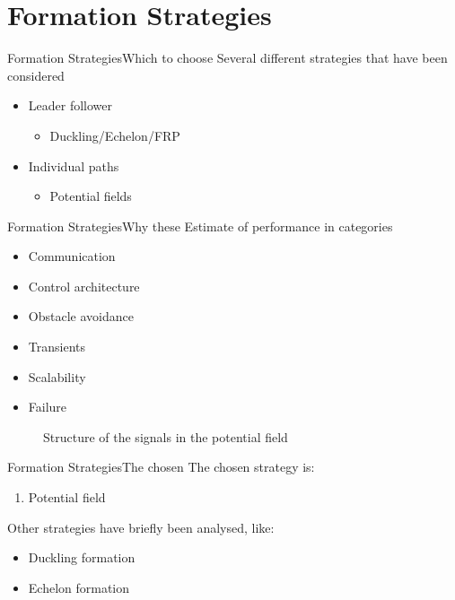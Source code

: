 \documentclass[10pt,handout]{beamer}
\begin{document}
\section{Formation Strategies}
\begin{frame}{Formation Strategies}{Which to choose}
Several different strategies that have been considered
  \begin{itemize}
    \item Leader follower
    \begin{itemize}
      \item Duckling/Echelon/FRP
    \end{itemize}
    \item Individual paths
    \begin{itemize}
      \item Potential fields
    \end{itemize}
   \end{itemize}
\end{frame}

\begin{frame}{Formation Strategies}{Why these}
Estimate of performance in categories
\begin{itemize}
  \item Communication
  \item Control architecture
  \item Obstacle avoidance
  \item Transients
  \item Scalability
  \item Failure
\end{itemize}
\begin{figure}
    {\tiny }
    \caption{\scriptsize Structure of the signals in the potential field}
  \end{figure}
\end{frame}

\begin{frame}{Formation Strategies}{The chosen}
The chosen strategy is:
\begin{enumerate}
  \item Potential field
\end{enumerate}
Other strategies have briefly been analysed, like:
\begin{itemize}
\item Duckling formation
\item Echelon formation
\end{itemize}
\end{frame}
\end{document}
